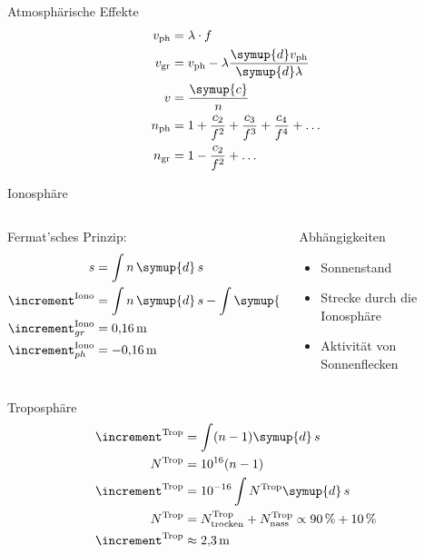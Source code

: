 \begin{frame}{Atmosphärische Effekte}
    \begin{align}
        v_\text{ph} &= \lambda\cdot f \\
        v_\text{gr} &= v_\text{ph}-\lambda\frac{\symup{d}v_\text{ph}}{\symup{d}\lambda} \\
        v &= \frac{\symup{c}}{n} \\
        n_\text{ph} &= 1+\frac{c_2}{f^2}+\frac{c_3}{f^3}+\frac{c_4}{f^4}+\ldots \\
        n_\text{gr} &= 1-\frac{c_2}{f^2}+\ldots \\
    \end{align}
\end{frame}

\begin{frame}{Ionosphäre}
    \begin{columns}
        \begin{column}{0.5\textwidth}
            Fermat'sches Prinzip:
            \begin{align}
                s &= \int n\,\symup{d}\,s \\
                \increment^\text{Iono} &= \int n\,\symup{d}\,s-\int\symup{d}\,s_0 \\
                \increment^\text{Iono}_{gr} &= \SI{0.16}{\meter} \\
                \increment^\text{Iono}_{ph} &= \SI{-0.16}{\meter}
            \end{align}
        \end{column}
        \begin{column}{0.5\textwidth}
            Abhängigkeiten
            \begin{itemize}
                \item Sonnenstand
                \item Strecke durch die Ionosphäre
                \item Aktivität von Sonnenflecken
            \end{itemize}
        \end{column}
    \end{columns}
\end{frame}

\begin{frame}{Troposphäre}
    \begin{align}
        \increment^\text{Trop} &= \int(n-1)\symup{d}\,s \\
        N^\text{Trop} &= \num{e16}(n-1) \\
        \increment^\text{Trop} &= \num{e-16}\int N^\text{Trop}\symup{d}\,s \\
        N^\text{Trop} &= N^\text{Trop}_\text{trocken} + N^\text{Trop}_\text{nass} \propto \SI{90}{\percent} + \SI{10}{\percent} \\
        \increment^\text{Trop} &\approx \SI{2.3}{\meter}
    \end{align}
\end{frame}

